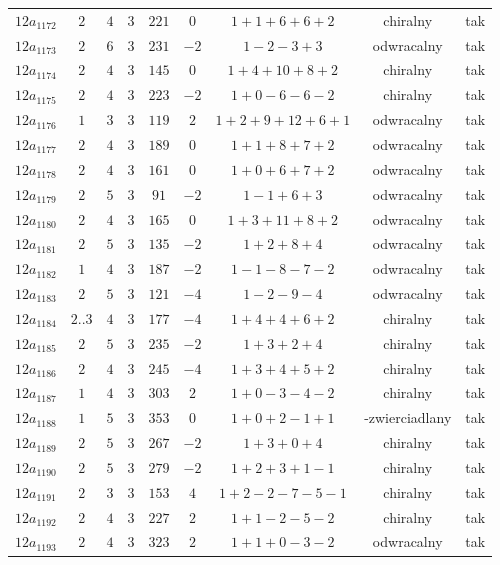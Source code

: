 \begin{longtable}{ccccccccc}
$12a_{1172}$ & $2$ & $4$ & $3$ & $221$ & $0$ & $1+1+6+6+2$ & chiralny & tak \\
$12a_{1173}$ & $2$ & $6$ & $3$ & $231$ & $-2$ & $1-2-3+3$ & odwracalny & tak \\
$12a_{1174}$ & $2$ & $4$ & $3$ & $145$ & $0$ & $1+4+10+8+2$ & chiralny & tak \\
$12a_{1175}$ & $2$ & $4$ & $3$ & $223$ & $-2$ & $1+0-6-6-2$ & chiralny & tak \\
$12a_{1176}$ & $1$ & $3$ & $3$ & $119$ & $2$ & $1+2+9+12+6+1$ & odwracalny & tak \\
$12a_{1177}$ & $2$ & $4$ & $3$ & $189$ & $0$ & $1+1+8+7+2$ & odwracalny & tak \\
$12a_{1178}$ & $2$ & $4$ & $3$ & $161$ & $0$ & $1+0+6+7+2$ & odwracalny & tak \\
$12a_{1179}$ & $2$ & $5$ & $3$ & $91$ & $-2$ & $1-1+6+3$ & odwracalny & tak \\
$12a_{1180}$ & $2$ & $4$ & $3$ & $165$ & $0$ & $1+3+11+8+2$ & odwracalny & tak \\
$12a_{1181}$ & $2$ & $5$ & $3$ & $135$ & $-2$ & $1+2+8+4$ & odwracalny & tak \\
$12a_{1182}$ & $1$ & $4$ & $3$ & $187$ & $-2$ & $1-1-8-7-2$ & odwracalny & tak \\
$12a_{1183}$ & $2$ & $5$ & $3$ & $121$ & $-4$ & $1-2-9-4$ & odwracalny & tak \\
$12a_{1184}$ & $2..3$ & $4$ & $3$ & $177$ & $-4$ & $1+4+4+6+2$ & chiralny & tak \\
$12a_{1185}$ & $2$ & $5$ & $3$ & $235$ & $-2$ & $1+3+2+4$ & chiralny & tak \\
$12a_{1186}$ & $2$ & $4$ & $3$ & $245$ & $-4$ & $1+3+4+5+2$ & chiralny & tak \\
$12a_{1187}$ & $1$ & $4$ & $3$ & $303$ & $2$ & $1+0-3-4-2$ & chiralny & tak \\
$12a_{1188}$ & $1$ & $5$ & $3$ & $353$ & $0$ & $1+0+2-1+1$ & -zwierciadlany & tak \\
$12a_{1189}$ & $2$ & $5$ & $3$ & $267$ & $-2$ & $1+3+0+4$ & chiralny & tak \\
$12a_{1190}$ & $2$ & $5$ & $3$ & $279$ & $-2$ & $1+2+3+1-1$ & chiralny & tak \\
$12a_{1191}$ & $2$ & $3$ & $3$ & $153$ & $4$ & $1+2-2-7-5-1$ & chiralny & tak \\
$12a_{1192}$ & $2$ & $4$ & $3$ & $227$ & $2$ & $1+1-2-5-2$ & chiralny & tak \\
$12a_{1193}$ & $2$ & $4$ & $3$ & $323$ & $2$ & $1+1+0-3-2$ & odwracalny & tak \\

\end{longtable}
